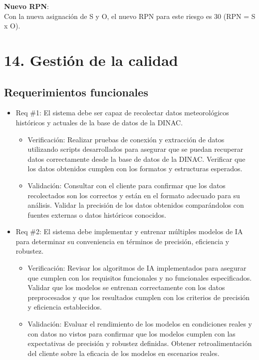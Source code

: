 \documentclass[
11pt, %
codirector, %
]{charter}
\begin{document}
\textbf{Nuevo RPN}:\\
Con la nueva asignación de S y O, el nuevo RPN para este riesgo es 30 (RPN = S x O).


\section{14. Gestión de la calidad}
\label{sec:calidad}

\subsection{Requerimientos funcionales}

\begin{itemize} 
\item Req \#1: El sistema debe ser capaz de recolectar datos meteorológicos históricos y actuales de la base de datos de la DINAC.

\begin{itemize}
	\item Verificación: Realizar pruebas de conexión y extracción de datos utilizando scripts desarrollados para asegurar que se puedan recuperar datos correctamente desde la base de datos de la DINAC. Verificar que los datos obtenidos cumplen con los formatos y estructuras esperados.
	\item Validación: Consultar con el cliente para confirmar que los datos recolectados son los correctos y están en el formato adecuado para su análisis. Validar la precisión de los datos obtenidos comparándolos con fuentes externas o datos históricos conocidos.
\end{itemize}

\item Req \#2: El sistema debe implementar y entrenar múltiples modelos de IA para determinar su conveniencia en términos de precisión, eficiencia y robustez.

\begin{itemize}
	\item Verificación: Revisar los algoritmos de IA implementados para asegurar que cumplen con los requisitos funcionales y no funcionales especificados. Validar que los modelos se entrenan correctamente con los datos preprocesados y que los resultados cumplen con los criterios de precisión y eficiencia establecidos.
	\item Validación: Evaluar el rendimiento de los modelos en condiciones reales y con datos no vistos para confirmar que los modelos cumplen con las expectativas de precisión y robustez definidas. Obtener retroalimentación del cliente sobre la eficacia de los modelos en escenarios reales.
\end{itemize}


\end{itemize}
\end{document}
